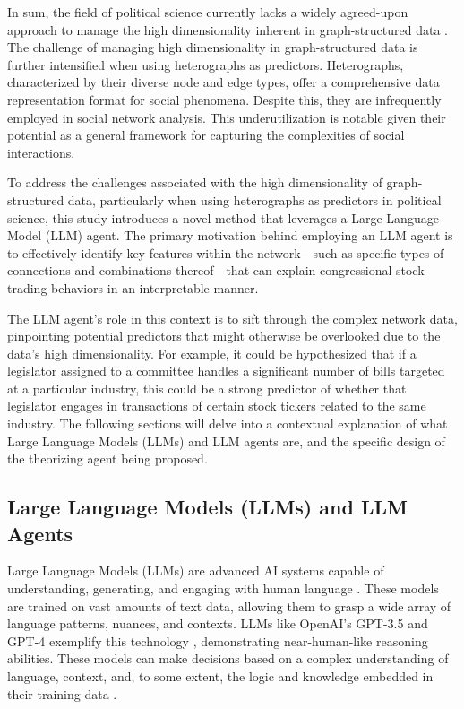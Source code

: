 \documentclass[15pt,letterpaper]{article}
\begin{document}
In sum, the field of political science currently lacks a widely agreed-upon approach to manage the high dimensionality inherent in graph-structured data \citep{Lazer2011NetworksIP,Ward2011NetworkAA}.
The challenge of managing high dimensionality in graph-structured data is further intensified when using heterographs as predictors. Heterographs, characterized by their diverse node and edge types, offer a comprehensive data representation format for social phenomena. Despite this, they are infrequently employed in social network analysis. This underutilization is notable given their potential as a general framework for capturing the complexities of social interactions.

To address the challenges associated with the high dimensionality of graph-structured data, particularly when using heterographs as predictors in political science, this study introduces a novel method that leverages a Large Language Model (LLM) agent. The primary motivation behind employing an LLM agent is to effectively identify key features within the network—such as specific types of connections and combinations thereof—that can explain congressional stock trading behaviors in an interpretable manner.

The LLM agent's role in this context is to sift through the complex network data, pinpointing potential predictors that might otherwise be overlooked due to the data's high dimensionality. For example, it could be hypothesized that if a legislator assigned to a committee handles a significant number of bills targeted at a particular industry, this could be a strong predictor of whether that legislator engages in transactions of certain stock tickers related to the same industry.
The following sections will delve into a contextual explanation of what Large Language Models (LLMs) and LLM agents are, and the specific design of the theorizing agent being proposed.

\subsection{Large Language Models (LLMs) and LLM Agents}

Large Language Models (LLMs) are advanced AI systems capable of understanding, generating, and engaging with human language  \citep{Zhao2023ASO}. 
These models are trained on vast amounts of text data, allowing them to grasp a wide array of language patterns, nuances, and contexts. LLMs like OpenAI's GPT-3.5 and GPT-4 exemplify this technology \citep{Radford2018ImprovingLU}, demonstrating near-human-like reasoning abilities. These models can make decisions based on a complex understanding of language, context, and, to some extent, the logic and knowledge embedded in their training data \citep{Lampinen2022CanLM}.
\end{document}
